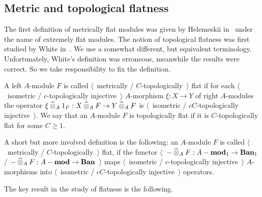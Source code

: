 
\subsection{
    Metric and topological flatness}\label{SubSectionMetricAndTopologicalFlatness}

The first definition of metrically flat modules was given by Helemeskii 
in~\cite{HelMetrFlatNorMod} under the name of extremely flat modules. The 
notion of topological flatness was first studied by 
White in~\cite{WhiteInjmoduAlg}. We use a somewhat different, but equivalent  
terminology. Unfortunately, White's definition was erroneous, meanwhile the results 
were correct. So we take responsibility to fix the definition.

\begin{definition}\label{MetCTopFlatMod} 
A left $A$-module $F$ is 
called $\langle$~metrically / $C$-topologically~$\rangle$ 
flat if for each $\langle$~isometric / $c$-topologically injective~$\rangle$ 
$A$-morphism $\xi:X\to Y$ of right $A$-modules the 
operator $\xi\mathbin{\widehat{\otimes}}_{A} 1_F:X\mathbin{\widehat{\otimes}}_{A} F\to Y\mathbin{\widehat{\otimes}}_{A} F$ 
is $\langle$~isometric / $c C$-topologically injective~$\rangle$. We say that an 
$A$-module $F$ is topologically flat if it is $C$-topologically flat for 
some $C\geq 1$.
\end{definition}

A short but more involved definition is the following: an $A$-module $F$ is
called $\langle$~metrically / $C$-topologically~$\rangle$ flat, if the functor
$\langle$~$-\mathbin{\widehat{\otimes}}_{A}F:A-\mathbf{mod}_1\to\mathbf{Ban}_1$ /
$-\mathbin{\widehat{\otimes}}_{A}F:A-\mathbf{mod}\to\mathbf{Ban}$~$\rangle$ maps
$\langle$~isometric / $c$-topologically injective~$\rangle$ $A$-morphisms into
$\langle$~isometric / $c C$-topologically injective~$\rangle$ operators.

The key result in the study of flatness is the following.

